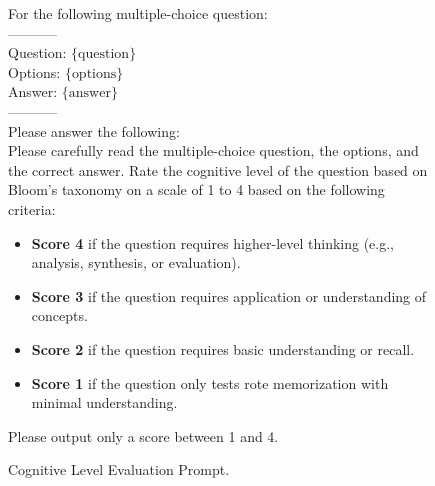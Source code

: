 \begin{figure}[h]
\centering
\begin{tcolorbox}[width=1\columnwidth, fontupper=\footnotesize,title=Cognitive Level Evaluation Prompt]
\RaggedRight
\obeylines

{For the following multiple-choice question:\\
-----------\\
Question: $\{\text{question}\}$\\
\vspace{3mm}
Options: $\{\text{options}\}$\\
\vspace{3mm}
Answer: $\{\text{answer}\}$\\
-----------\\
Please answer the following:\\

Please carefully read the multiple-choice question, the options, and the correct answer.  
Rate the cognitive level of the question based on Bloom's taxonomy on a scale of 1 to 4 based on the following criteria:
\begin{itemize}[label=-,nosep]
    \item \textbf{Score 4} if the question requires higher-level thinking (e.g., analysis, synthesis, or evaluation).
    \item \textbf{Score 3} if the question requires application or understanding of concepts.
    \item \textbf{Score 2} if the question requires basic understanding or recall.
    \item \textbf{Score 1} if the question only tests rote memorization with minimal understanding.
\end{itemize}

Please output only a score between 1 and 4.
}

\end{tcolorbox}
\caption{Cognitive Level Evaluation Prompt.}
\label{fig:cognitive_level_prompt}
\end{figure}



